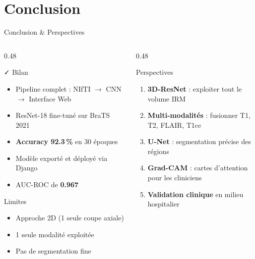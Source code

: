\documentclass[aspectratio=169, 12pt]{beamer}
\begin{document}
\section{Conclusion}

\begin{frame}{Conclusion \& Perspectives}
  \begin{columns}[T]

    \begin{column}{0.48\textwidth}
      \begin{block}{\faCheck\; Bilan}
        \begin{itemize}
          \item Pipeline complet : NIfTI $\to$ CNN $\to$ Interface Web
          \item ResNet-18 fine-tuné sur BraTS 2021
          \item \textbf{Accuracy 92.3\,\%} en 30 époques
          \item Modèle exporté et déployé via Django
          \item AUC-ROC de \textbf{0.967}
        \end{itemize}
      \end{block}

      \vspace{0.4em}
      \begin{alertblock}{\faExclamationCircle\; Limites}
        \begin{itemize}
          \item Approche 2D (1 seule coupe axiale)
          \item 1 seule modalité exploitée
          \item Pas de segmentation fine
        \end{itemize}
      \end{alertblock}
    \end{column}

    \begin{column}{0.48\textwidth}
      \begin{exampleblock}{\faRocket\; Perspectives}
        \begin{enumerate}
          \item \textbf{3D-ResNet} : exploiter tout le volume IRM
          \item \textbf{Multi-modalités} : fusionner T1, T2, FLAIR, T1ce
          \item \textbf{U-Net} : segmentation précise des régions
          \item \textbf{Grad-CAM} : cartes d'attention pour les cliniciens
          \item \textbf{Validation clinique} en milieu hospitalier
        \end{enumerate}
      \end{exampleblock}


\end{column}
\end{columns}
\end{frame}
\end{document}
